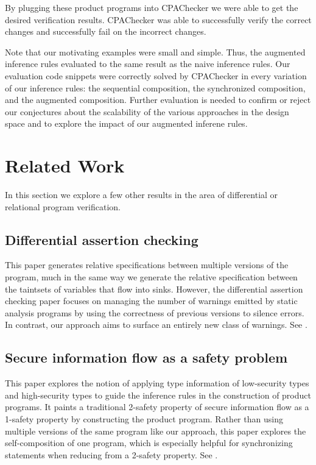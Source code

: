\documentclass[letterpaper,twocolumn,10pt]{article}
\begin{document}
By plugging these product programs into CPAChecker we were able to get the desired verification results. CPAChecker was able to successfully verify the correct changes and successfully fail on the incorrect changes. 

Note that our motivating examples were small and simple. Thus, the augmented inference rules evaluated to the same result as the naive inference rules. Our evaluation code snippets were correctly solved by CPAChecker in every variation of our inference rules: the sequential composition, the synchronized composition, and the augmented composition. Further evaluation is needed to confirm or reject our conjectures about the scalability of the various approaches in the design space and to explore the impact of our augmented inferene rules.

\section{Related Work}

In this section we explore a few other results in the area of differential or relational program verification.

\subsection{Differential assertion checking}

This paper generates relative specifications between multiple versions of the program, much in the same way we generate the relative specification between the taintsets of variables that flow into sinks. However, the differential assertion checking paper focuses on managing the number of warnings emitted by static analysis programs by using the correctness of previous versions to silence errors. In contrast, our approach aims to surface an entirely new class of warnings. See \cite{lahiri2013differential}.

\subsection{Secure information flow as a safety problem}
This paper explores the notion of applying type information of low-security types and high-security types to guide the inference rules in the construction of product programs. It paints a traditional 2-safety property of secure information flow as a 1-safety property by constructing the product program. Rather than using multiple versions of the same program like our approach, this paper explores the self-composition of one program, which is especially helpful for synchronizing statements when reducing from a 2-safety property. See  \cite{terauchi2005secure}.
\end{document}
